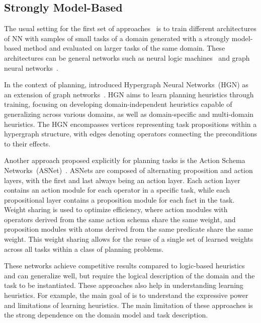 \subsection{Strongly Model-Based}
\label{sec:related-work-strongly}

The usual setting for the first set of approaches~\cite{Toyer.etal/2018,Shen.etal/2020,Toyer.etal/2020,Gehring.etal/2022,Stahlberg.etal/2022} is to train different architectures of NN with samples of small tasks of a domain generated with a strongly model-based method and evaluated on larger tasks of the same domain. These architectures can be general networks such as neural logic machines~\cite{Dong.etal/2018} and graph neural networks~\cite{Gori.etal/2005,Scarselli.etal/2008}.

In the context of planning, \citet{Shen.etal/2020} introduced Hypergraph Neural Networks~(HGN) as an extension of graph networks~\cite{Battaglia.etal/2018}. HGN aims to learn planning heuristics through training, focusing on developing domain-independent heuristics capable of generalizing across various domains, as well as domain-specific and multi-domain heuristics. The HGN encompasses vertices representing task propositions within a hypergraph structure, with edges denoting operators connecting the preconditions to their effects.

Another approach proposed explicitly for planning tasks is the Action Schema Networks~(ASNet)~\cite{Toyer.etal/2018}. ASNets are composed of alternating proposition and action layers, with the first and last always being an action layer. Each action layer contains an action module for each operator in a specific task, while each propositional layer contains a proposition module for each fact in the task. Weight sharing is used to optimize efficiency, where action modules with operators derived from the same action schema share the same weight, and proposition modules with atoms derived from the same predicate share the same weight. This weight sharing allows for the reuse of a single set of learned weights across all tasks within a class of planning problems.

These networks achieve competitive results compared to logic-based heuristics and can generalize well, but require the logical description of the domain and the task to be instantiated. These approaches also help in understanding learning heuristics. For example, the main goal of \citet{Stahlberg.etal/2022} is to understand the expressive power and limitations of learning heuristics. The main limitation of these approaches is the strong dependence on the domain model and task description.

